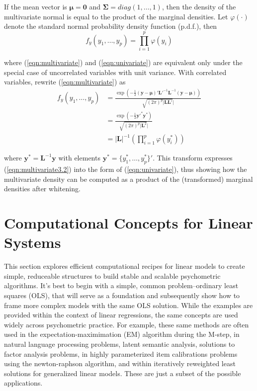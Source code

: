 \documentclass[12pt]{article}
\begin{document}
\noindent If the mean vector is $\bm{\mu} = \bm{0}$ and $\bm{\Sigma} = diag(1, \ldots, 1)$, then the density of the multivariate normal is equal to the product of the marginal densities. Let $\varphi(\cdot)$ denote the standard normal probability density function (p.d.f.), then
\begin{equation}
\label{eqn:univariate}
f_y(y_1, \ldots, y_p)  =  \prod_{i=1}^p\varphi(y_i)
\end{equation}

\noindent where (\ref{eqn:multivariate}) and (\ref{eqn:univariate}) are equivalent only under the special case of uncorrelated variables with unit variance. With correlated variables, rewrite (\ref{eqn:multivariate}) as
\begin{align}
\label{eqn:multivariate2}
f_y(y_1, \ldots, y_p)  & =  \frac{\exp(-\frac{1}{2}(\bm{y} - \bm{\mu})'\bm{L}'^{-1}\bm{L}^{-1}(\bm{y} - \bm{\mu}))}{\sqrt{(2\pi)^p|\bm{L}\bm{L}'}|}\\
				&=  \frac{\exp(-\frac{1}{2}\bm{y}'^{*}\bm{y}^{*}  )}{\sqrt{(2\pi)^p|\bm{L}^2}|} \label{eqn:multivariate3.1}\\
				& =  |\bm{L}|^{-1}\left(\prod_{i=1}^p\varphi(y^*_i)\right) \label{eqn:multivariate3.2}
\end{align}

\noindent where $\bm{y}^* = \bm{L}^{-1}\bm{y}$ with elements $\bm{y}^{*} = \{y_1^*, \ldots, y_p^*\}'$. This transform expresses (\ref{eqn:multivariate3.2}) into the form of (\ref{eqn:univariate}), thus showing how the multivariate density can be computed as a product of the (transformed) marginal densities after whitening.

\section*{Computational Concepts for Linear Systems}

This section explores efficient computational recipes for linear models to create simple, reduceable structures to build stable and scalable psychometric algorithms. It's best to begin with a simple, common problem--ordinary least squares (OLS), that will serve as a foundation and subsequently show how to frame more complex models with the same OLS solution. While the examples are provided within the context of linear regressions, the same concepts are used widely across psychometric practice. For example, these same methods are often used in the expectation-maximimation (EM) algorithm during the M-step, in natural language processing problems, latent semantic analysis, solutions to factor analysis problems, in highly parameterized item calibrations problems using the newton-raphson algorithm, and within iteratively reweighted least solutions for generalized linear models. These are just a subset of the possible applications.  
\end{document}
